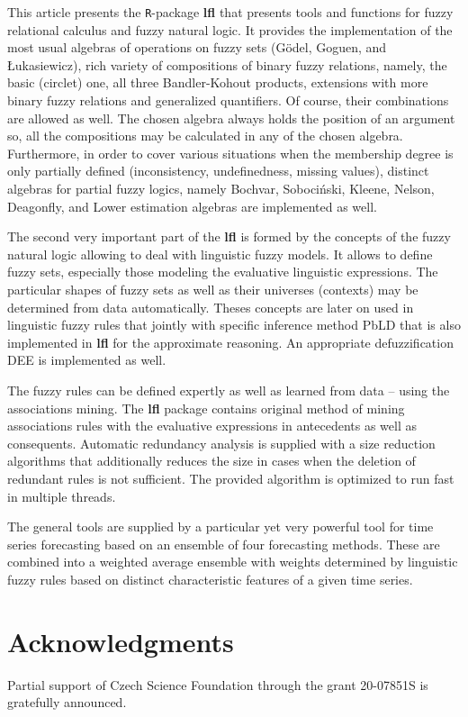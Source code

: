 \documentclass[review]{elsarticle}
\newcommand{\pkg}[1]{\textbf{#1}}
\newcommand{\code}[1]{\texttt{#1}}
\begin{document}
This article presents the \code{R}-package \pkg{lfl} that presents tools and functions for fuzzy relational calculus and fuzzy natural logic. It provides the implementation of the most usual algebras of operations on fuzzy sets (G\"{o}del, Goguen, and \L ukasiewicz), rich variety of compositions of binary fuzzy relations, namely, the basic (circlet) one, all three Bandler-Kohout products, extensions with more binary fuzzy relations and generalized quantifiers. Of course, their combinations are allowed as well. The chosen algebra always holds the position of an argument so, all the compositions may be calculated in any of the chosen algebra. Furthermore, in order to cover various situations when the membership degree is only partially defined  (inconsistency, undefinedness, missing values), distinct algebras for partial fuzzy logics, namely Bochvar, Soboci\'{n}ski, Kleene, Nelson, Deagonfly, and Lower estimation algebras are implemented as well.  

 The second very important part of the \pkg{lfl} is formed by the concepts of the fuzzy natural logic allowing to deal with linguistic fuzzy models. It allows to define fuzzy sets, especially those modeling the evaluative linguistic expressions. The particular shapes of fuzzy sets as well as their universes (contexts) may be determined from data automatically. Theses concepts are later on used in linguistic fuzzy rules that jointly with specific inference method PbLD that is also implemented in \pkg{lfl} for the approximate reasoning. An appropriate defuzzification DEE is implemented as well. 
 
 The fuzzy rules can be defined expertly as well as learned from data -- using the associations mining. The \pkg{lfl} package contains original method of mining associations rules with the evaluative expressions in antecedents as well as consequents. Automatic redundancy analysis is supplied with a size reduction algorithms that additionally reduces the size in cases when the deletion of redundant rules is not sufficient. The provided algorithm is optimized to run fast in multiple threads.
 
 The general tools are supplied by a particular yet very powerful tool for time series forecasting based on an ensemble of four forecasting methods. These are combined into a weighted average ensemble  with weights determined by linguistic fuzzy rules based on distinct characteristic features of a given time series. 


 
 

\section*{Acknowledgments}

Partial support of Czech Science Foundation through the grant 20-07851S is gratefully announced.




\end{document}
